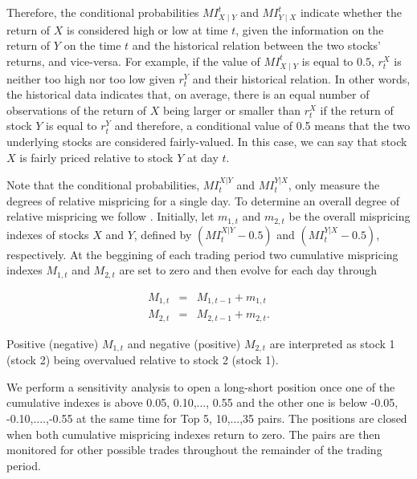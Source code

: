 \documentclass[a4paper]{article}
\begin{document}
	Therefore, the conditional probabilities $MI_{X\mid Y}^{t}$ and $MI_{Y\mid X}^{t}$ indicate whether the return of $X$ is considered high or low at time $t$, given the information on the return of $Y$ on the time $t$ and the historical relation between the two stocks' returns, and vice-versa. For example, if the value of $MI_{X\mid Y}^{t}$ is equal to $0.5$, $r_{t}^{X}$ is neither too high nor too low given $r_{t}^{Y}$ and their historical relation. In other words, the historical data indicates that, on average, there is an equal number of observations of the return of $X$ being larger or smaller than $r_{t}^{X}$ if the return of stock $Y$ is equal to $r_{t}^{Y}$ and therefore, a conditional value of 0.5 means that the two underlying stocks are considered fairly-valued. In this case, we can say that stock $X$ is fairly priced relative to stock $Y $ at day $t$. 
	
	Note that the conditional probabilities, $MI_{t}^{X\left\vert Y\right. }$ and $%
		MI_{t}^{Y\left\vert X\right. }$, only measure the degrees of relative
		mispricing for a single day. To determine an overall degree of relative
		mispricing we follow \citet*{rf15}. Initially, let $m_{1,t}$ and $m_{2,t}$ be the
		overall mispricing indexes of stocks $X$ and $Y$, defined by $\left(
		MI_{t}^{X\left\vert Y\right. }-0.5\right) $ and $\left( MI_{t}^{Y\left\vert
			X\right. }-0.5\right) $, respectively. At the beggining of each
		trading period two cumulative mispricing indexes $M_{1,t}$ and $M_{2,t}$ are set
		to zero and then evolve for each day through%

	
	\begin{eqnarray*}
		M_{1,t} &=&M_{1,t-1}+m_{1,t} \\
		M_{2,t} &=&M_{2,t-1}+m_{2,t}.
	\end{eqnarray*}
	
	Positive (negative) $M_{1,t}$ and negative (positive) $M_{2,t}$ are interpreted
		as stock 1 (stock 2) being overvalued relative to stock 2 (stock 1).
		
	We
		perform a sensitivity analysis to open a long-short position once one of the
		cumulative indexes is above 0.05, 0.10,..., 0.55 and the other one is below
		-0.05, -0.10,....,-0.55 at the same time for Top 5, 10,...,35 pairs. The
		positions are closed when both cumulative mispricing indexes return to zero.
		The pairs are then monitored for other possible trades throughout the
		remainder of the trading period.
		
	
\end{document}
